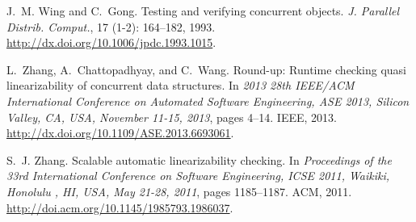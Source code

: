 \documentclass[9pt,natbib,authoryear]{sigplanconf}
\begin{document}
\begin{thebibliography}{26}
J.~M. Wing and C.~Gong.
\newblock Testing and verifying concurrent objects.
\newblock \emph{J. Parallel Distrib. Comput.}, 17 (1-2):
  164--182, 1993.
\newblock \url{http://dx.doi.org/10.1006/jpdc.1993.1015}.

L.~Zhang, A.~Chattopadhyay, and C.~Wang.
\newblock Round-up: Runtime checking quasi linearizability of concurrent data
  structures.
\newblock In \emph{2013 28th {IEEE/ACM} International Conference on Automated
  Software Engineering, {ASE} 2013, Silicon Valley, CA, USA, November 11-15,
  2013}, pages 4--14. {IEEE}, 2013.
\newblock \url{http://dx.doi.org/10.1109/ASE.2013.6693061}.

S.~J. Zhang.
\newblock Scalable automatic linearizability checking.
\newblock In \emph{Proceedings of the 33rd International Conference on Software
  Engineering, {ICSE} 2011, Waikiki, Honolulu , HI, USA, May 21-28, 2011},
  pages 1185--1187. {ACM}, 2011.
\newblock \url{http://doi.acm.org/10.1145/1985793.1986037}.

\end{thebibliography}
\end{document}
